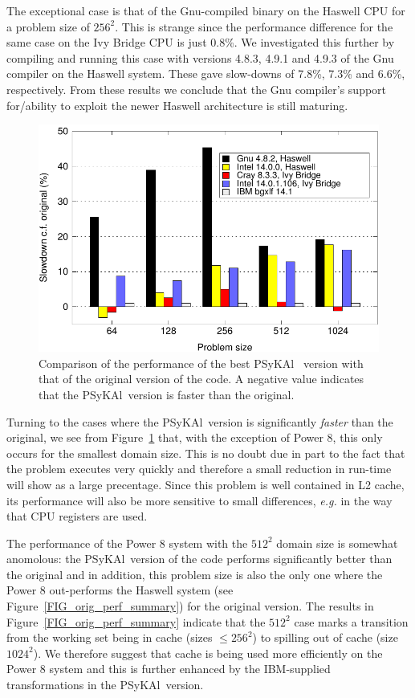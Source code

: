 \documentclass{IOS-Book-Article}
\newcommand{\psykal}{{PS}y{KA}l\ }
\begin{document}
The exceptional case is that of the Gnu-compiled binary on the Haswell
CPU for a problem size of $256^2$.  This is strange since the
performance difference for the same case on the Ivy Bridge CPU is just
0.8\%. We investigated this further by compiling and running this case
with versions 4.8.3, 4.9.1 and 4.9.3 of the Gnu compiler on the
Haswell system. These gave slow-downs of 7.8\%, 7.3\% and 6.6\%,
respectively. From these results we conclude that the Gnu compiler's
support for/ability to exploit the newer Haswell architecture is still
maturing.

\begin{figure}[!t]
\centering
\includegraphics[width=120mm]{slowdown_summary}
\caption{Comparison of the performance of the best \psykal
version with that of the original version of the code. A negative value 
indicates that the \psykal version is faster than the original.}
\label{FIG_slowdown_summary}
\end{figure}

Turning to the cases where the \psykal version is significantly
{\em faster} than the original, we see from
Figure~\ref{FIG_slowdown_summary} that, with the exception of Power 8,
this only occurs for the smallest domain size. This is no doubt due in
part to the fact that the problem executes very quickly and therefore
a small reduction in run-time will show as a large precentage. Since
this problem is well contained in L2 cache, its performance will also
be more sensitive to small differences, {\it e.g.} in the way that CPU
registers are used. 

The performance of the Power 8 system with the $512^2$ domain size is
somewhat anomolous: the \psykal version of the code performs
significantly better than the original and in addition, this problem
size is also the only one where the Power 8 out-performs the Haswell
system (see Figure~\ref{FIG_orig_perf_summary}) for the original
version.  The results in Figure~\ref{FIG_orig_perf_summary} indicate
that the $512^2$ case marks a transition from the working set being in
cache (sizes $\leq 256^2$) to spilling out of cache (size $1024^2$). We
therefore suggest that cache is being used more efficiently on the
Power 8 system and this is further enhanced by the IBM-supplied
transformations in the \psykal version.
\end{document}
